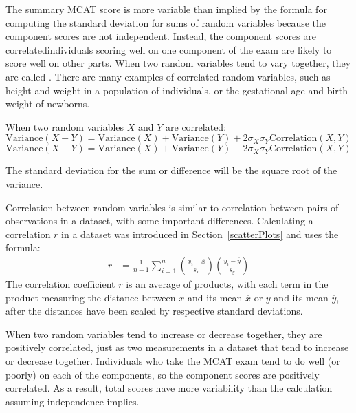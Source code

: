 The summary MCAT score is more variable than implied by the formula for computing the standard deviation for sums of random variables because the component scores are not independent. Instead, the component scores are correlated\textemdash individuals scoring well on one component of the exam are likely to score well on other parts.  When two random variables tend to vary together, they are called .  There are many examples of correlated random variables, such as height and weight in a population of individuals, or the gestational age and birth weight of newborns.  

When two random variables $X$ and $Y$ are correlated:
\begin{equation} 
\text{Variance}(X + Y) = \text{Variance}(X) + \text{Variance}(Y) + 
2 \sigma_X \sigma_Y\text{Correlation}(X,Y) 
\label{eq:generalVarianceSumRVs}
\end{equation}
\begin{equation}
\text{Variance}(X - Y) = \text{Variance}(X) + \text{Variance}(Y) - 
2 \sigma_X \sigma_Y\text{Correlation}(X,Y) 
\label{eq:generalVarianceDiffRVs}
\end{equation}

The standard deviation for the sum or difference will be the square root of the variance.


Correlation between random variables is similar to correlation between pairs of observations in a dataset, with some important differences.  Calculating a correlation $r$ in a dataset was introduced in Section~\ref{scatterPlots} and uses the formula:
\begin{align}
r &=  \frac{1}{n-1}\sum^{n}_{i=1}
\left(\frac{x_{i}-\overline{x}}
{s_{x}}\right)\left(\frac{y_{i}-\overline{y}}{s_{y}}\right)
\end{align} 
The correlation coefficient $r$ is an average of products, with each term in the product measuring the distance between $x$ and its mean $\overline{x}$ or $y$ and its mean $\overline{y}$, after the distances have been scaled by respective standard deviations.

When two random variables tend to increase or decrease together, they are positively correlated, just as two measurements in a dataset that tend to increase or decrease together. Individuals who take the MCAT exam tend to do well (or poorly) on each of the components, so the component scores are positively correlated.  As a result, total scores have more variability than the calculation assuming independence implies.


